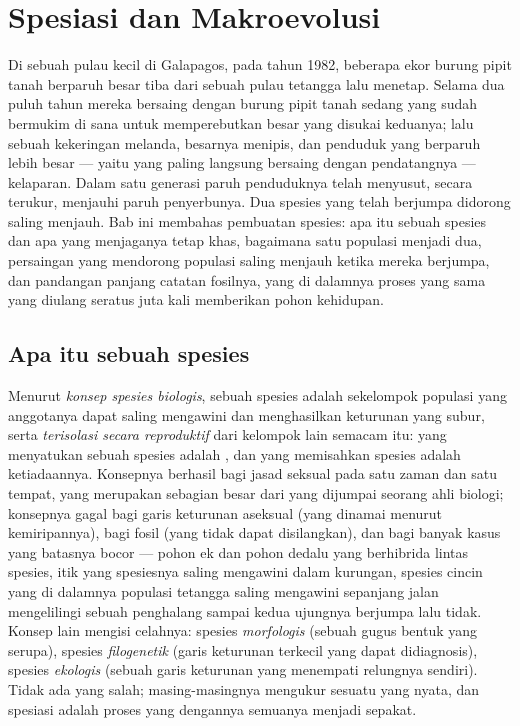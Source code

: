 \chapter{Spesiasi dan Makroevolusi}\label{ch:b2:speciation}

Di sebuah pulau kecil di Galapagos, pada tahun 1982, beberapa ekor
burung pipit tanah berparuh besar tiba dari sebuah pulau tetangga lalu
menetap. Selama dua puluh tahun mereka bersaing dengan burung pipit
tanah sedang yang sudah bermukim di sana untuk memperebutkan  besar
yang disukai keduanya; lalu sebuah kekeringan melanda,  besarnya
menipis, dan penduduk yang berparuh lebih besar --- yaitu yang paling
langsung bersaing dengan pendatangnya --- kelaparan. Dalam satu
generasi paruh penduduknya telah menyusut, secara terukur, menjauhi
paruh penyerbunya. Dua spesies yang telah berjumpa didorong saling
menjauh. Bab ini membahas pembuatan spesies: apa itu sebuah spesies dan
apa yang menjaganya tetap khas, bagaimana satu populasi menjadi dua,
persaingan yang mendorong populasi saling menjauh ketika mereka
berjumpa, dan pandangan panjang catatan fosilnya, yang di dalamnya
proses yang sama yang diulang seratus juta kali memberikan pohon
kehidupan.

\section{Apa itu sebuah spesies}

\begin{definition}[Spesies]\label{def:b2:speciation:species}
Menurut \emph{konsep spesies biologis}, sebuah spesies adalah
sekelompok populasi yang anggotanya dapat saling mengawini dan
menghasilkan keturunan yang subur, serta \emph{terisolasi secara
reproduktif} dari kelompok lain semacam itu: yang menyatukan sebuah
spesies adalah , dan yang memisahkan spesies adalah
ketiadaannya. Konsepnya berhasil bagi jasad seksual pada satu zaman dan
satu tempat, yang merupakan sebagian besar dari yang dijumpai seorang
ahli biologi; konsepnya gagal bagi garis keturunan aseksual (yang
dinamai menurut kemiripannya), bagi fosil (yang tidak dapat
disilangkan), dan bagi banyak kasus yang batasnya bocor --- pohon ek
dan pohon dedalu yang berhibrida lintas spesies, itik yang spesiesnya
saling mengawini dalam kurungan, spesies cincin yang di dalamnya
populasi tetangga saling mengawini sepanjang jalan mengelilingi sebuah
penghalang sampai kedua ujungnya berjumpa lalu tidak. Konsep lain
mengisi celahnya: spesies \emph{morfologis} (sebuah gugus bentuk yang
serupa), spesies \emph{filogenetik} (garis keturunan terkecil yang
dapat didiagnosis), spesies \emph{ekologis} (sebuah garis keturunan
yang menempati relungnya sendiri). Tidak ada yang salah;
masing-masingnya mengukur sesuatu yang nyata, dan spesiasi adalah
proses yang dengannya semuanya menjadi sepakat.
\end{definition}

